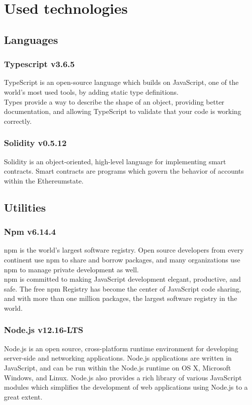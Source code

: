 \section{Used technologies}

\subsection{Languages}
\subsubsection*{Typescript v3.6.5}
TypeScript is an open-source language which builds on JavaScript, one of the world’s most used tools, by adding static type definitions.\\
Types provide a way to describe the shape of an object, providing better documentation, and allowing TypeScript to validate that your code is working correctly.

\subsubsection*{Solidity v0.5.12}
Solidity is an object-oriented, high-level language for implementing smart contracts.
Smart contracts are programs which govern the behavior of accounts within the Ethereum\glo state.

\subsection{Utilities}

\subsubsection*{Npm v6.14.4}
npm is the world’s largest software registry. Open source developers from every continent use npm to share and borrow packages, and many organizations use npm to manage private development as well.\\
npm is committed to making JavaScript development elegant, productive, and safe. The free npm Registry has become the center of JavaScript code sharing, and with more than one million packages, the largest software registry in the world. 

\subsubsection*{Node.js v12.16-LTS}
Node.js is an open source, cross-platform runtime environment for developing server-side and networking applications. 
Node.js applications are written in JavaScript, and can be run within the Node.js runtime on OS X, Microsoft Windows, and Linux.
Node.js also provides a rich library of various JavaScript modules which simplifies the development of web applications using Node.js to a great extent.

